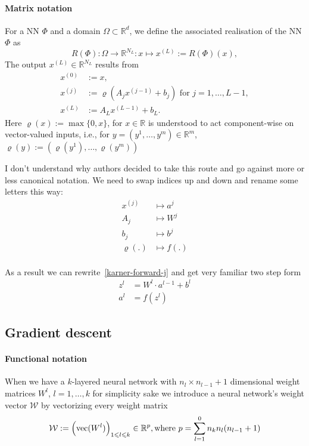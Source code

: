 \documentclass[draft]{article}
\def\RealSet{\mathbb{R}}
\DeclareMathOperator{\vect}{vec}
\begin{document}
\paragraph{Matrix notation}
For a NN $\Phi$ and a domain $\Omega\subset\RealSet^d$, we define the associated realisation of the NN $\Phi$ as
\[
R(\Phi) \colon \Omega \rightarrow \RealSet^{N_L} \colon x \mapsto x^{(L)}:=R(\Phi)(x),
\]
The output $x^{(L)}\in \RealSet^{N_L}$ results from
\begin{align}
x^{(0)} &:= x,\\
x^{(j)} &:= \varrho(A_j x^{(j-1)} + b_j) \text{ for $j=1,\dots,L-1$}, \label{karner-forward-j}\\
x^{(L)} &:= A_L x^{(L-1)} + b_L.
\end{align}
Here $\varrho(x) := \max \{0,x\}$, for $x\in\RealSet$ is understood to act component-wise on vector-valued inputs, i.e., for $y=(y^1,\dots,y^m)\in\RealSet^m$, $\varrho(y) := (\varrho(y^1),\dots,\varrho(y^m))$

I don't understand why authors decided to take this route and go against more or less canonical notation. We need to swap indices up and down and rename some letters this way:
\begin{align}
x^{(j)} &\mapsto a^j \\
A_j &\mapsto W^j \\
b_j &\mapsto b^j \\
\varrho(.) &\mapsto f(.) \\
\end{align}

As a result we can rewrite~\eqref{karner-forward-j} and get very familiar two step form
\begin{align}
z^l &= W^l \cdot a^{l-1} + b^l \\
a^l &= f(z^l)
\end{align}


\subsection{Gradient descent}

\paragraph{Functional notation}
When we have a $k$-layered neural network with $n_l \times n_{l-1}+1$ dimensional weight matrices $W^l$, $l=1,\dots,k$ for simplicity sake we introduce a neural network's weight vector $\mathcal{W}$ by vectorizing every weight matrix
\[
\mathcal{W} := \Bigl(\vect(W^l)\Bigr)_{1\leqslant l\leqslant k} \in \RealSet^p, \text{where $p=\sum_{l=1}^0{n_k}n_l(n_{l-1}+1)$}
\]
\end{document}
